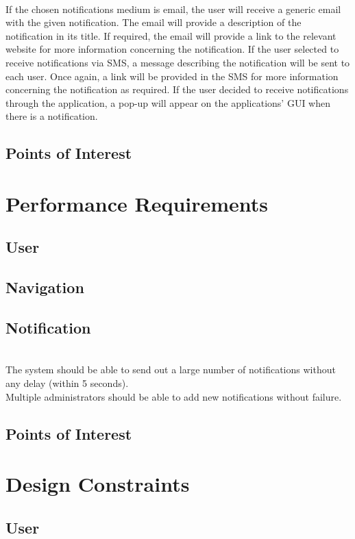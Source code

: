 \documentclass[runningheads,a4paper]{article}
\begin{document}
\mbox{}\\
If the chosen notifications medium is email, the user will receive a generic email with the given notification. The email will provide a description of the notification in its title. If required, the email will provide a link to the relevant website for more information concerning the notification. If the user selected to receive notifications via SMS, a message describing the notification will be sent to each user. Once again, a link will be provided in the SMS for more information concerning the notification as required. If the user decided to receive notifications through the application, a pop-up will appear on the applications’ GUI when there is a notification. 

\subsection{Points of Interest}


\section{Performance Requirements}

\subsection{User}
\subsection{Navigation}
\subsection{Notification}
\mbox{}\\
The system should be able to send out a large number of notifications without any delay (within 5 seconds).\\
Multiple administrators should be able to add new notifications without failure.
\subsection{Points of Interest}


\section{Design Constraints}

\subsection{User}
\end{document}
